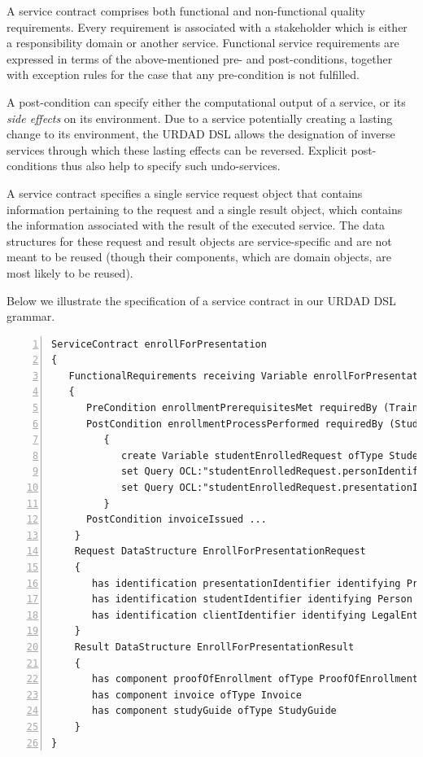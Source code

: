 A service contract comprises both functional and non-functional quality requirements. Every requirement is associated with a stakeholder which is either a responsibility domain or another service. Functional service requirements are expressed in terms of the above-mentioned pre- and post-conditions, together with exception rules for the case that any pre-condition is not fulfilled. 

A post-condition can specify either the computational output of a service, or its \emph{side effects} on its environment. Due to a service potentially creating a lasting change to its environment, the URDAD DSL allows the designation of inverse services through which these lasting effects can be reversed. Explicit post-conditions thus also help to specify such undo-services.

A service contract specifies a single service request object that contains information pertaining to the request and a single result object, which contains the information associated with the result of the executed service. The data structures for these request and result objects are service-specific and are not meant to be reused (though their components, which are domain objects, are most likely to be reused). 

Below we illustrate the specification of a service contract in our URDAD DSL grammar.
\lstset{language=urdad,caption=Specifying a service contract in the textual URDAD DSL syntax.,label=contractTextSyntax}
\begin{lstlisting}[numbers=left,escapechar=|]
ServiceContract enrollForPresentation
{
   FunctionalRequirements receiving Variable enrollForPresentationRequest ofType EnrollForPresentationRequest
   {
      PreCondition enrollmentPrerequisitesMet requiredBy (TrainingRegulator Student) raises EnrollmentPrerequisitesNotSatisfiedException checks constraint enrollmentPrerequisitesForPresentationMet with ValueOf enrollForPresentationRequest
      PostCondition enrollmentProcessPerformed requiredBy (Student Client TrainingRegulator) ensures constraint studentEnrolledForPresentation          with ValueOf studentEnrolledRequest constructedUsing doSequential
         {
            create Variable studentEnrolledRequest ofType StudentEnrolledRequest
            set Query OCL:"studentEnrolledRequest.personIdentifier" equalTo Query OCL:"enrollForPresentationRequest.personIdentifier"                            
            set Query OCL:"studentEnrolledRequest.presentationIdentifier" equalTo Query OCL:"enrollForPresentationRequest.presentationIdentifier"                            
         }  
      PostCondition invoiceIssued ...
    }            
    Request DataStructure EnrollForPresentationRequest 
    {
       has identification presentationIdentifier identifying Presentation
       has identification studentIdentifier identifying Person
       has identification clientIdentifier identifying LegalEntity         
    }
    Result DataStructure EnrollForPresentationResult 
    {
       has component proofOfEnrollment ofType ProofOfEnrollment
       has component invoice ofType Invoice
       has component studyGuide ofType StudyGuide
    }
}
\end{lstlisting}


